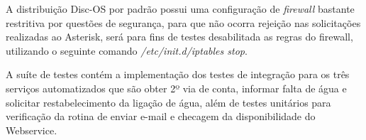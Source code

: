 A distribuição Disc-OS por padrão possui uma configuração de \textit{firewall} bastante restritiva por questões de segurança, para que não ocorra rejeição nas solicitações realizadas ao Asterisk, será para fins de testes desabilitada as regras do firewall, utilizando o seguinte comando \textit{/etc/init.d/iptables stop}.
 
A suíte de testes contém a implementação dos testes de integração para os três serviços automatizados que são obter 2º via de conta, informar falta de água e solicitar restabelecimento da ligação de água, além de testes unitários para verificação da rotina de enviar e-mail e checagem da disponibilidade do Webservice.


